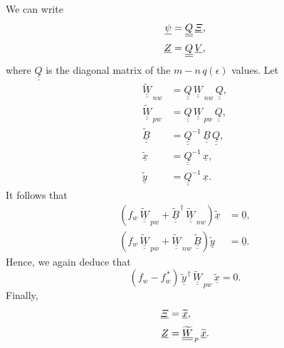 \documentclass[12pt,prb,aps,notitlepage]{revtex4-1}
\begin{document}
We can write
\begin{align}
\underline{\psi} &= \underline{\underline{Q}}\,\underline{\mit\Xi},\\[0.5ex]
\underline{Z} &= \underline{\underline{Q}}\,\underline{V},
\end{align}
where $\underline{\underline{Q}}$ is the diagonal matrix of the $m-n\,q(\epsilon)$ values. 
Let
\begin{align}
\underline{\underline{\widetilde{W}}}_{\,nw} &= \underline{\underline{Q}}\,\underline{\underline{W}}_{\,nw}\,\underline{\underline{Q}},\\[0.5ex]
\underline{\underline{\widetilde{W}}}_{\,pw} &= \underline{\underline{Q}}\,\underline{\underline{W}}_{\,pw}\,\underline{\underline{Q}},\\[0.5ex]
\underline{\underline{\widetilde{B}}} &= \underline{\underline{Q}}^{-1}\,\underline{\underline{B}}\,\underline{\underline{Q}},\\[0.5ex]
\underline{\widetilde{x}}&=  \underline{\underline{Q}}^{-1}\,\underline{x},\\[0.5ex]
\underline{\widetilde{y}}&=  \underline{\underline{Q}}^{-1}\,\underline{x}.
\end{align}
It follows that 
\begin{align}
\left(f_w\,\underline{\underline{\widetilde{W}}}_{\,pw}
+\underline{\underline{\widetilde{B}}}^{\,\dag}\,\underline{\underline{\widetilde{W}}}_{\,nw}\right)\underline{\widetilde{x}}&=\underline{0},\\[0.5ex]
\left(f_w\,\underline{\underline{\widetilde{W}}}_{\,pw}
+\underline{\underline{\widetilde{W}}}_{\,nw}\,\underline{\underline{\widetilde{B}}}\right)\underline{\widetilde{y}} &=\underline{0}.\label{e142a}
\end{align}
Hence, we again deduce that 
\begin{equation}
(f_w-f_w^{\,\ast})\,\underline{\widetilde{y}}^{\,\dag}\,\underline{\underline{\widetilde{W}}}_{\,pw}\,\underline{\widetilde{x}} = 0.
\end{equation}
Finally, 
\begin{align}
\underline{\mit\Xi} &=\underline{\widetilde{x}},\\[0.5ex]
\underline{Z} &= \underline{\underline{\widetilde{W}}}_{\,p} \,\underline{\widetilde{x}}.
\end{align}
\end{document}
